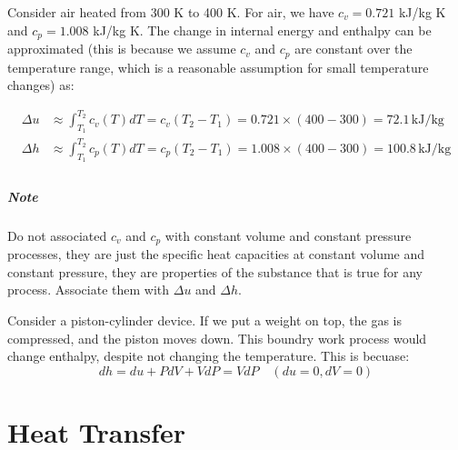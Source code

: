 \documentclass[11pt]{report}
\begin{document}
\begin{example}
    Consider air heated from 300 K to 400 K. For air, we have $c_v = 0.721$ kJ/kg K and $c_p = 1.008$ kJ/kg K. The change in internal energy and enthalpy can be approximated (this is because we assume $c_v$ and $c_p$ are constant over the temperature range, which is a reasonable assumption for small temperature changes) as:

    \begin{align*}
        \Delta u &\approx \int_{T_1}^{T_2} c_v(T) dT = c_v (T_2 - T_1) = 0.721 \times (400 - 300) = 72.1\, \text{kJ/kg} \\
        \Delta h &\approx \int_{T_1}^{T_2} c_p(T) dT = c_p (T_2 - T_1) = 1.008 \times (400 - 300) = 100.8\, \text{kJ/kg} \\
    \end{align*}
\end{example}

\paragraph{Note} Do not associated $c_v$ and $c_p$ with constant volume and constant pressure processes, they are just the specific heat capacities at constant volume and constant pressure, they are properties of the substance that is true for any process. Associate them with $\Delta u$ and $\Delta h$.

\begin{example}
    Consider a piston-cylinder device. If we put a weight on top, the gas is compressed, and the piston moves down. This boundry work process would change enthalpy, despite not changing the temperature. This is becuase:
    $$
        dh = du + PdV + VdP = VdP \quad (du = 0, dV = 0)
    $$
\end{example}
\chapter{Heat Transfer}
\end{document}
